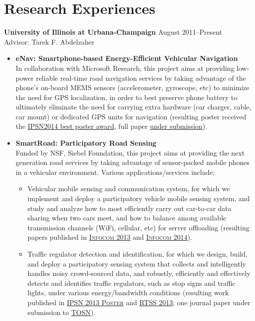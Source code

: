 \section{\sc Research Experiences} {\bf University of Illinois at Urbana-Champaign} \hfill August 2011--Present\\
Advisor: Tarek F. Abdelzaher 
\begin{itemize}
	\item \textbf{eNav: Smartphone-based Energy-Efficient Vehicular Navigation}\\ In collaboration with Microsoft Research, this project aims at providing low-power reliable real-time road navigation services by taking advantage of the phone's on-board MEMS sensors (accelerometer, gyroscope, etc) to minimize the need for GPS localization, in order to best preserve phone battery to ultimately eliminate the need for carrying extra hardware (car charger, cable, car mount) or dedicated GPS units for navigation (resulting poster received the \hyperlink{hu2014ipsn}{IPSN2014 best poster award}, full paper \hyperlink{hu2014sensys}{under submission}).

	\item \textbf{SmartRoad: Participatory Road Sensing} \\
	Funded by NSF, Siebel Foundation, this project aims at providing the next generation road services by taking advantage of sensor-packed mobile phones in a vehicular environment. Various applications/services include: 
	\begin{itemize}
		\item Vehicular mobile sensing and communication system, for which we implement and deploy a participatory vehicle mobile sensing system, and study and analyze how to most efficiently carry out car-to-car data sharing when two cars meet, and how to balance among available transmission channels (WiFi, cellular, etc) for server offloading (resulting papers published in \hyperlink{liu2013infocom}{\textsc{Infocom 2013}} and \hyperlink{hu2014infocom}{\textsc{Infocom 2014}}).
		
		\item Traffic regulator detection and identification, for which we design, build, and deploy a participatory sensing system that collects and intelligently handles noisy crowd-sourced data, and robustly, efficiently and effectively detects and identifies traffic regulators, such as stop signs and traffic lights, under various energy/bandwidth conditions (resulting work published in \hyperlink{hu2013ipsn}{\textsc{IPSN 2013 Poster}} and \hyperlink{wang2013rtss}{\textsc{RTSS 2013}}; one journal paper under submission to \hyperlink{hu2013tosn}{\textsc{TOSN}}).
		

\end{itemize}
\end{itemize}
